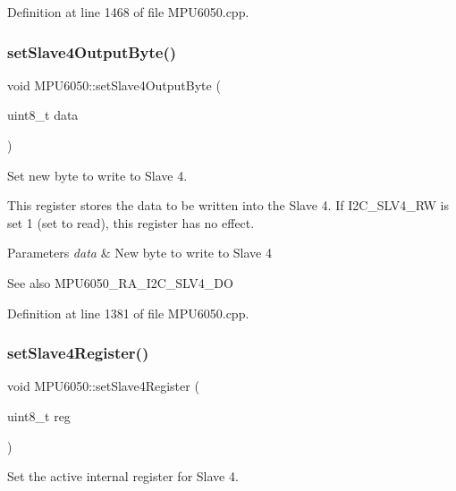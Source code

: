 Definition at line 1468 of file M\+P\+U6050.\+cpp.

\mbox{\label{classMPU6050_a17147a6f477be79f58889e9e6329392f}} 
\subsubsection{\texorpdfstring{setSlave4OutputByte()}{setSlave4OutputByte()}}
{\footnotesize\ttfamily void M\+P\+U6050\+::set\+Slave4\+Output\+Byte (\begin{DoxyParamCaption}\item[{uint8\+\_\+t}]{data }\end{DoxyParamCaption})}



Set new byte to write to Slave 4. 

This register stores the data to be written into the Slave 4. If I2\+C\+\_\+\+S\+L\+V4\+\_\+\+RW is set 1 (set to read), this register has no effect. 
\begin{DoxyParams}{Parameters}
{\em data} & New byte to write to Slave 4 \\
\hline
\end{DoxyParams}
\begin{DoxySeeAlso}{See also}
M\+P\+U6050\+\_\+\+R\+A\+\_\+\+I2\+C\+\_\+\+S\+L\+V4\+\_\+\+DO 
\end{DoxySeeAlso}


Definition at line 1381 of file M\+P\+U6050.\+cpp.

\mbox{\label{classMPU6050_ae54dc358da048e61a1ac68012300fdaa}} 
\subsubsection{\texorpdfstring{setSlave4Register()}{setSlave4Register()}}
{\footnotesize\ttfamily void M\+P\+U6050\+::set\+Slave4\+Register (\begin{DoxyParamCaption}\item[{uint8\+\_\+t}]{reg }\end{DoxyParamCaption})}



Set the active internal register for Slave 4. 


